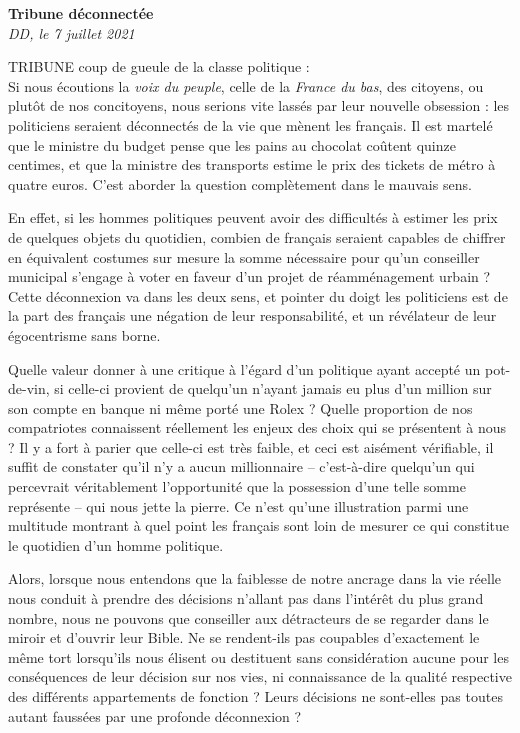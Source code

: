 \documentclass[french,12pt,amstex,a4paper]{article}
\begin{document}
\begin{center}
{\bf Tribune déconnectée}\\
{\it DD, le 7 juillet 2021}\\
\end{center}

TRIBUNE coup de gueule de la classe politique :\\

Si nous écoutions la {\it voix du peuple}, celle de la {\it France du bas}, des citoyens, ou plutôt de nos concitoyens, nous serions vite lassés par leur nouvelle obsession : les politiciens seraient déconnectés de la vie que mènent les français. Il est martelé que le ministre du budget pense que les pains au chocolat coûtent quinze centimes, et que la ministre des transports estime le prix des tickets de métro à quatre euros. C'est aborder la question complètement dans le mauvais sens.

En effet, si les hommes politiques peuvent avoir des difficultés à estimer les prix de quelques objets du quotidien, combien de français seraient capables de chiffrer en équivalent costumes sur mesure la somme nécessaire pour qu'un conseiller municipal s'engage à voter en faveur d'un projet de réamménagement urbain ? Cette déconnexion va dans les deux sens, et pointer du doigt les politiciens est de la part des français une négation de leur responsabilité, et un révélateur de leur égocentrisme sans borne.

Quelle valeur donner à une critique à l'égard d'un politique ayant accepté un pot-de-vin, si celle-ci provient de quelqu'un n'ayant jamais eu plus d'un million sur son compte en banque ni même porté une Rolex ? Quelle proportion de nos compatriotes connaissent réellement les enjeux des choix qui se présentent à nous ? Il y a fort à parier que celle-ci est très faible, et ceci est aisément vérifiable, il suffit de constater qu'il n'y a aucun millionnaire -- c'est-à-dire quelqu'un qui percevrait véritablement l'opportunité que la possession d'une telle somme représente -- qui nous jette la pierre. Ce n'est qu'une illustration parmi une multitude montrant à quel point les français sont loin de mesurer ce qui constitue le quotidien d'un homme politique.

Alors, lorsque nous entendons que la faiblesse de notre ancrage dans la vie réelle nous conduit à prendre des décisions n'allant pas dans l'intérêt du plus grand nombre, nous ne pouvons que conseiller aux détracteurs de se regarder dans le miroir et d'ouvrir leur Bible. Ne se rendent-ils pas coupables d'exactement le même tort lorsqu'ils nous élisent ou destituent sans considération aucune pour les conséquences de leur décision sur nos vies, ni connaissance de la qualité respective des différents appartements de fonction ? Leurs décisions ne sont-elles pas toutes autant faussées par une profonde déconnexion ?
\end{document}
